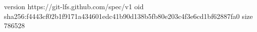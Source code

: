 version https://git-lfs.github.com/spec/v1
oid sha256:f4443cf02b1f9171a434601edc41b90d138b5fb80e203c4f3e6cd1bf62887fa0
size 786528
